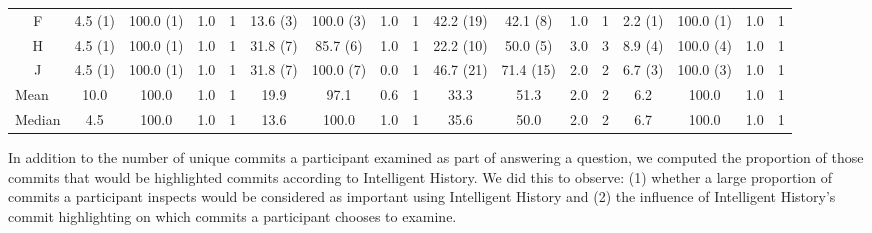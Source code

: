 \begin{landscape}
\begin{table}
{\begin{tabular}{@{}ccccccccccccccccc@{}}
        \multicolumn{1}{c|}{F}              & 4.5 (1)  & 100.0 (1) & 1.0  & \multicolumn{1}{c|}{1}    & 13.6 (3)                 & 100.0 (3)                & 1.0                      & \multicolumn{1}{c|}{1}    & 42.2 (19) & 42.1 (8)                 & 1.0                      & \multicolumn{1}{c|}{1}    & 2.2 (1)                  & 100.0 (1)                & 1.0                      & 1                        \\
        \multicolumn{1}{c|}{H}              & 4.5 (1)  & 100.0 (1) & 1.0  & \multicolumn{1}{c|}{1}    & 31.8 (7)                 & 85.7 (6)                 & 1.0                      & \multicolumn{1}{c|}{1}    & 22.2 (10) & 50.0 (5)                 & 3.0                      & \multicolumn{1}{c|}{3}    & 8.9 (4)                  & 100.0 (4)                & 1.0                      & 1                        \\
        \multicolumn{1}{c|}{J}              & 4.5 (1)  & 100.0 (1) & 1.0  & \multicolumn{1}{c|}{1}    & 31.8 (7)                 & 100.0 (7)                & 0.0                      & \multicolumn{1}{c|}{1}    & 46.7 (21) & 71.4 (15)                & 2.0                      & \multicolumn{1}{c|}{2}    & 6.7 (3)                  & 100.0 (3)                & 1.0                      & 1                        \\ \midrule
        \multicolumn{1}{l|}{Mean}           & 10.0     & 100.0     & 1.0  & \multicolumn{1}{c|}{1}    & 19.9                     & 97.1                     & 0.6                      & \multicolumn{1}{c|}{1}    & 33.3      & 51.3                     & 2.0                      & \multicolumn{1}{c|}{2}    & 6.2                      & 100.0                    & 1.0                      & 1                        \\
        \multicolumn{1}{l|}{Median}         & 4.5      & 100.0     & 1.0  & \multicolumn{1}{c|}{1}    & 13.6                     & 100.0                    & 1.0                      & \multicolumn{1}{c|}{1}    & 35.6      & 50.0                     & 2.0                      & \multicolumn{1}{c|}{2}    & 6.7                      & 100.0                    & 1.0                      & 1                        \\ \bottomrule
      \end{tabular}
    }%
    \label{tab:Results-Quantitative-BA}
  \end{table}
\end{landscape}

In addition to the number of unique commits a participant examined as part of answering a question,
we computed the proportion of those commits that would be highlighted commits according to Intelligent History.
We did this to observe:
(1) whether a large proportion of commits a participant inspects would be considered as important using Intelligent History
and (2) the influence of Intelligent History's commit highlighting on which commits a participant chooses to examine.

